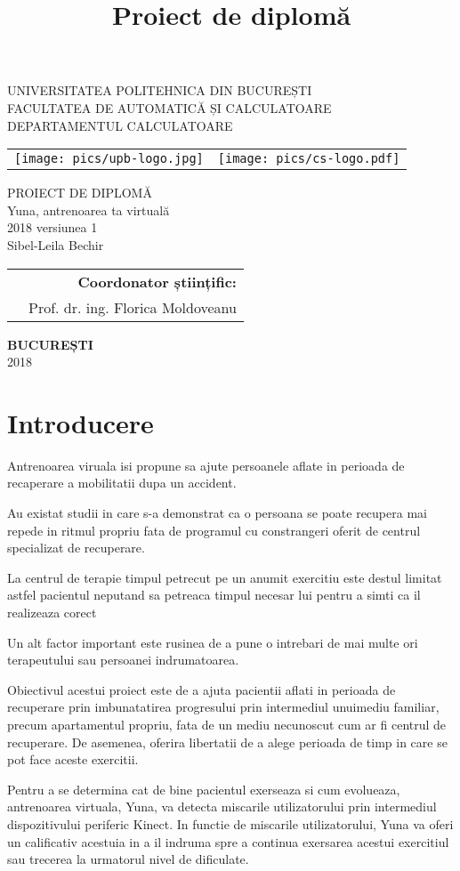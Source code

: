 \documentclass[12pt,a4paper]{report}
\title{Proiect de diplomă}
\author{\Name}
\date{\Year}
\makeatletter
\newcommand{\HeaderLineSpace}{-0.5cm}
\newcommand{\UniTextRO}{UNIVERSITATEA POLITEHNICA DIN BUCUREȘTI \\[\HeaderLineSpace] 
FACULTATEA DE AUTOMATICĂ ȘI CALCULATOARE \\[\HeaderLineSpace]
DEPARTAMENTUL CALCULATOARE\\}
\newcommand{\DiplomaRO}{PROIECT DE DIPLOMĂ}
\newcommand{\AdvisorRO}{Coordonator științific:}
\newcommand{\BucRO}{BUCUREȘTI}
\newcommand{\UniTextEN}{UNIVERSITY POLITEHNICA OF BUCHAREST \\[\HeaderLineSpace]
FACULTY OF AUTOMATIC CONTROL AND COMPUTERS \\[\HeaderLineSpace]
COMPUTER SCIENCE DEPARTMENT\\}
\newcommand{\DiplomaEN}{DIPLOMA PROJECT}
\newcommand{\AdvisorEN}{Thesis advisor:}
\newcommand{\BucEN}{BUCHAREST}
\newcommand{\frontPage}[6]{
\begin{titlepage}
\begin{center}
{\Large #1}  %
\vspace{50pt}
\begin{tabular}{p{6cm}p{4cm}}
\texttt{[image: pics/upb-logo.jpg]} &
	\texttt{[image: pics/cs-logo.pdf]}
\end{tabular}

\vspace{105pt}
{\Huge #2}\\                           %
\vspace{40pt}
{\Large #3}\\ \vspace{0pt}  %
{\Large #4}\\                          %
\vspace{40pt}
{\LARGE \Name}\\                   %
\end{center}
\vspace{60pt}
\begin{tabular*}{\textwidth}{@{\extracolsep{\fill}}p{6cm}r}
&{\large\textbf{#5}}\vspace{10pt}\\      %
&{\large \Advisor}                                    %
\end{tabular*}
\vspace{20pt}
\begin{center}
{\large\textbf{#6}}\\                                %
\vspace{0pt}
{\normalsize \Year}
\end{center}
\end{titlepage}
}
\newcommand{\frontPageRO}{\frontPage{\UniTextRO}{\DiplomaRO}{\ProjectTitleRO}{\ProjectSubtitleRO}{\AdvisorRO}{\BucRO}}
\newcommand{\frontPageEN}{\frontPage{\UniTextEN}{\DiplomaEN}{\ProjectTitleEN}{\ProjectSubtitleEN}{\AdvisorEN}{\BucEN}}
\newcommand{\ThanksPage}{
\begin{titlepage}
{\noindent \large\textbf{MULȚUMIRI}}\\
\Thanks
\end{titlepage}
}
\newcommand{\ProjectTitleRO}{Yuna, antrenoarea ta virtuală}
\newcommand{\ProjectSubtitleRO}{2018 versiunea 1}
\newcommand{\ProjectTitleEN}{Yuna, your virtual coaching}
\newcommand{\ProjectSubtitleEN}{2018 version 1}
\newcommand{\Name}{Sibel-Leila Bechir}
\newcommand{\Advisor}{Prof. dr. ing. Florica Moldoveanu}
\newcommand{\Year}{2018}
\makeatother
\begin{document}
\frontPageRO


\begingroup
\linespread{1}
\tableofcontents
\endgroup



\newpage


\chapter{Introducere}

\pagestyle{fancy}

Antrenoarea viruala isi propune sa ajute persoanele aflate in perioada de recaperare a mobilitatii dupa un accident. 

Au existat studii in care s-a demonstrat ca o persoana se poate recupera mai repede in ritmul propriu fata de programul cu constrangeri oferit de centrul specializat de recuperare. 

La centrul de terapie timpul petrecut pe un anumit exercitiu este destul limitat astfel pacientul neputand sa petreaca timpul necesar lui pentru a simti ca il realizeaza corect


Un alt factor important este rusinea de a pune o intrebari de mai multe ori terapeutului sau persoanei indrumatoarea.

Obiectivul acestui proiect este de a ajuta pacientii aflati in perioada de recuperare prin imbunatatirea progresului prin intermediul unuimediu familiar, precum apartamentul propriu, fata de un mediu necunoscut cum ar fi centrul de recuperare. De asemenea, oferira libertatii de a alege perioada de timp in care se pot face aceste exercitii.

Pentru a se determina cat de bine pacientul exerseaza si cum evolueaza, antrenoarea virtuala, Yuna, va detecta miscarile utilizatorului prin intermediul dispozitivului periferic Kinect. In functie de miscarile utilizatorului, Yuna  va oferi un calificativ acestuia in a il indruma spre a continua exersarea acestui exercitiul sau trecerea la urmatorul nivel de dificulate.



\end{document}
